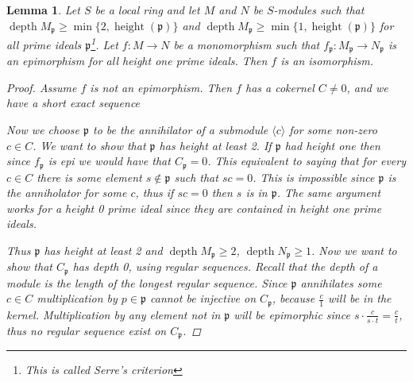 \documentclass[11pt, a4paper, english]{article}
\numberwithin{prop}{section}
\newtheorem{lemma}{Lemma}
\numberwithin{lemma}{section}
\numberwithin{theorem}{section}
\numberwithin{defin}{section}
\numberwithin{example}{section}
\DeclareMathOperator{\depth}{depth}
\DeclareMathOperator{\height}{height}
\begin{document}
\begin{lemma}
\label{lem:height_one_iso}
Let $S$ be a local ring and let $M$ and $N$ be $S$-modules such that $\depth M_\mathfrak{p} \geq \min \{ 2, \height(\mathfrak{p}) \}$ and $\depth M_\mathfrak{p} \geq \min \{ 1, \height(\mathfrak{p}) \}$ for all prime ideals $\mathfrak{p}$\footnote{This is called Serre's criterion}. Let $f: M \to N$ be a monomorphism such that $f_\mathfrak{p}: M_\mathfrak{p} \to N_\mathfrak{p}$ is an epimorphism for all height one prime ideals. Then $f$ is an isomorphism.
\begin{proof}
Assume $f$ is not an epimorphism. Then $f$ has a cokernel $C \neq 0$, and we have a short exact sequence
\begin{center}
\end{center}
Now we choose $\mathfrak{p}$ to be the annihilator of a submodule $\langle c \rangle$ for some non-zero $c \in C$. We want to show that $\mathfrak{p}$ has height at least 2. If $\mathfrak{p}$ had height one then since $f_\mathfrak{p}$ is epi we would have that $C_\mathfrak{p} = 0$. This equivalent to saying that for every $c \in C$ there is some element $s \not\in \mathfrak{p}$ such that $sc = 0$. This is impossible since $\mathfrak{p}$ is the anniholator for some $c$, thus if $sc=0$ then $s$ is in $\mathfrak{p}$. The same argument works for a height 0 prime ideal since they are contained in height one prime ideals.

Thus $\mathfrak{p}$ has height at least 2 and $\depth M_\mathfrak{p} \geq 2$, $\depth N_\mathfrak{p} \geq 1$. Now we want to show that $C_\mathfrak{p}$ has depth 0, using regular sequences. Recall that the depth of a module is the length of the longest regular sequence. Since $\mathfrak{p}$ annihilates some $c \in C$ multiplication by $p \in \mathfrak{p}$ cannot be injective on $C_\mathfrak{p}$, because $\frac{c}{1}$ will be in the kernel. Multiplication by any element not in $\mathfrak{p}$ will be epimorphic since $s \cdot \frac{c}{s \cdot t} = \frac{c}{t}$, thus no regular sequence exist on $C_\mathfrak{p}$.


\end{proof}
\end{lemma}
\end{document}
